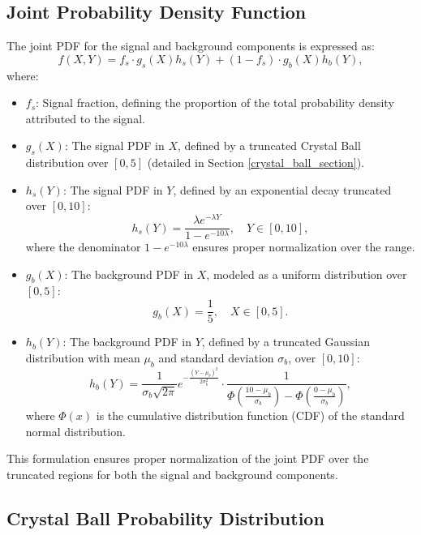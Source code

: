 \documentclass[11pt, a4paper]{article}
\begin{document}
\subsection{Joint Probability Density Function}

The joint PDF for the signal and background components is expressed as:
\begin{equation}
    f(X, Y) = f_s \cdot g_s(X) h_s(Y) + (1 - f_s) \cdot g_b(X) h_b(Y),
\end{equation}
where:
\begin{itemize}
    \item \( f_s \): Signal fraction, defining the proportion of the total probability density attributed to the signal.
    \item \( g_s(X) \): The signal PDF in \( X \), defined by a truncated Crystal Ball distribution over \( [0, 5] \) (detailed in Section \ref{crystal_ball_section}).
    \item \( h_s(Y) \): The signal PDF in \( Y \), defined by an exponential decay truncated over \( [0, 10] \):
    \begin{equation}
        h_s(Y) = \frac{\lambda e^{-\lambda Y}}{1 - e^{-10 \lambda}}, \quad Y \in [0, 10],
    \end{equation}
    where the denominator \( 1 - e^{-10 \lambda} \) ensures proper normalization over the range.
    \item \( g_b(X) \): The background PDF in \( X \), modeled as a uniform distribution over \( [0, 5] \):
    \begin{equation}
        g_b(X) = \frac{1}{5}, \quad X \in [0, 5].
    \end{equation}
    \item \( h_b(Y) \): The background PDF in \( Y \), defined by a truncated Gaussian distribution with mean \(\mu_b\) and standard deviation \(\sigma_b\), over \( [0, 10] \):
    \begin{equation}
        h_b(Y) = \frac{1}{\sigma_b \sqrt{2\pi}} e^{-\frac{(Y - \mu_b)^2}{2\sigma_b^2}} \cdot \frac{1}{\Phi\left(\frac{10 - \mu_b}{\sigma_b}\right) - \Phi\left(\frac{0 - \mu_b}{\sigma_b}\right)},
    \end{equation}
    where \(\Phi(x)\) is the cumulative distribution function (CDF) of the standard normal distribution.
\end{itemize}
This formulation ensures proper normalization of the joint PDF over the truncated regions for both the signal and background components.

\subsection{Crystal Ball Probability Distribution \label{crystal_ball_section}}
\end{document}
